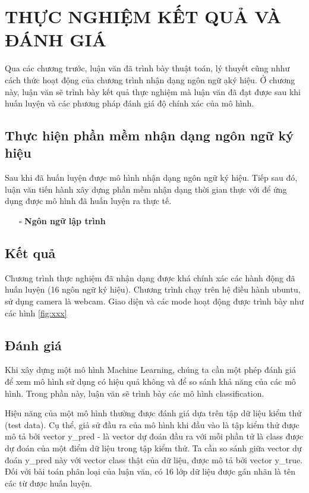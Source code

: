 \chapter{THỰC NGHIỆM KẾT QUẢ VÀ ĐÁNH GIÁ}
Qua các chương trước, luận văn đã trình bày thuật toán, lý thuyết cũng nhhư cách thức hoạt động của chương trình nhận dạng ngôn ngữ ạký hiệu. Ở chương này, luận văn sẽ trình bày kết quả thực nghiệm mà luận văn đã đạt được sau khi huấn luyện và các phương pháp đánh giá độ chính xác của mô hình.
\section{Thực hiện phần mềm nhận dạng ngôn ngữ ký hiệu}
Sau khi đã huấn luyện được mô hình nhận dạng ngôn ngữ ký hiệu. Tiếp sau đó, luận văn tiến hành xây dựng phần mềm nhận dạng thời gian thực với để ứng dụng được mô hình đã huấn luyện ra thực tế.
\begin{itemize}
\item[$\square$] \textbf{Ngôn ngữ lập trình}

\end{itemize}


\section{Kết quả}
Chương trình thực nghiệm đã nhận dạng được khá chính xác các hành động đã huấn luyện (16 ngôn ngữ ký hiệu). Chương trình chạy trên hệ điều hành ubuntu, sử dụng camera là webcam. Giao diện và các mode hoạt động được trình bày như các hình \ref{fig:xxx}

\section{Đánh giá}
Khi xây dựng một mô hình Machine Learning, chúng ta cần một phép đánh giá để xem mô hình sử dụng có hiệu quả không và để so sánh khả năng của các mô hình. Trong phần này, luận văn sẽ trình bày các mô hình classification.

Hiệu năng của một mô hình thường được đánh giá dựa trên tập dữ liệu kiểm thử (test data). Cụ thể, giả sử đầu ra của mô hình khi đầu vào là tập kiểm thử được mô tả bởi vector y_pred - là vector dự đoán đầu ra với mỗi phần tử là class được dự đoán của một điểm dữ liệu trong tập kiểm thử. Ta cần so sánh giữa vector dự đoán y_pred này với vector class thật của dữ liệu, được mô tả bởi vector y_true. Đối với bài toán phân loại của luận văn, có 16 lớp dữ liệu được gán nhãn là tên các từ được huấn luyện.


